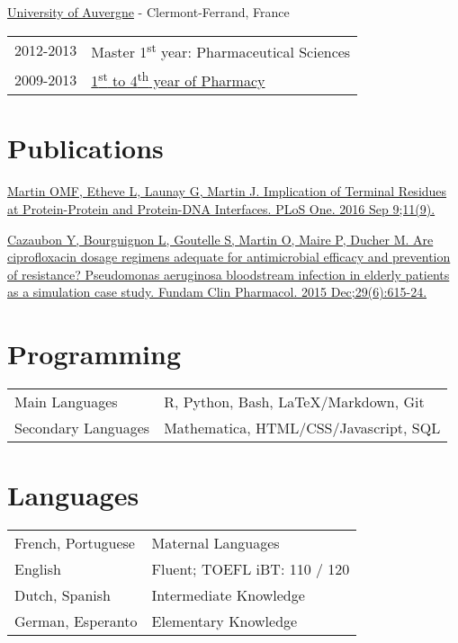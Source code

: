 \documentclass[a4paper, 10pt]{article} %
\begin{document}
\href{http://www.u-clermont1.fr/}{University of Auvergne} - Clermont-Ferrand, France

\begin{tabular}{ll}
\textsc{2012-2013} & Master 1\textsuperscript{st} year: Pharmaceutical Sciences \\
\textsc{2009-2013} & \href{http://pharmacie.u-clermont1.fr/}{1\textsuperscript{st} to 4\textsuperscript{th} year of Pharmacy}
\end{tabular}


\section{Publications}

\href{http://www.ncbi.nlm.nih.gov/pubmed/27611671}{Martin OMF, Etheve L, Launay G, Martin J. Implication of Terminal Residues at Protein-Protein and Protein-DNA Interfaces. PLoS One. 2016 Sep 9;11(9).}

\href{http://www.ncbi.nlm.nih.gov/pubmed/26406268}{Cazaubon Y, Bourguignon L, Goutelle S, Martin O, Maire P, Ducher M. Are ciprofloxacin dosage regimens adequate for antimicrobial efficacy and prevention of resistance? Pseudomonas aeruginosa bloodstream infection in elderly patients as a simulation case study. Fundam Clin Pharmacol. 2015 Dec;29(6):615-24.}


\section{Programming}
\begin{tabular}{ll}
Main Languages & R, Python, Bash, \LaTeX/Markdown, Git \\
Secondary Languages & Mathematica, HTML/CSS/Javascript, SQL \\
\end{tabular}


\section{Languages}
\begin{tabular}{ll}
French, Portuguese & Maternal Languages\\
English & Fluent; TOEFL iBT: 110 / 120\\
Dutch, Spanish & Intermediate Knowledge \\
German, Esperanto & Elementary Knowledge \\
\end{tabular}
\end{document}
